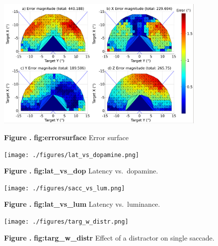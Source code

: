 \documentclass{frontiersSCNS}
\begin{document}
\begin{figure}[htb!]
\begin{center}
\includegraphics[width=0.9\textwidth]{./figures/errorsurface.png}
\end{center}
\textbf{\label{fig:errorsurface} Figure .}
{ \textbf{fig:errorsurface} Error surface}
\end{figure}

\begin{figure}[htb!]
\begin{center}
\texttt{[image: ./figures/lat\_vs\_dopamine.png]}
\end{center}
\textbf{\label{fig:lat_vs_dop} Figure .}
{ \textbf{fig:lat\_vs\_dop} Latency vs.~dopamine.}
\end{figure}

\begin{figure}[htb!]
\begin{center}
\texttt{[image: ./figures/sacc\_vs\_lum.png]}
\end{center}
\textbf{\label{fig:lat_vs_lum} Figure .}
{ \textbf{fig:lat\_vs\_lum} Latency vs.~luminance.}
\end{figure}

\begin{figure}[htb!]
\begin{center}
\texttt{[image: ./figures/targ\_w\_distr.png]}
\end{center}
\textbf{\label{fig:targ_w_distr} Figure .}
{ \textbf{fig:targ\_w\_distr} Effect of a distractor on single saccade.}
\end{figure}
\end{document}
